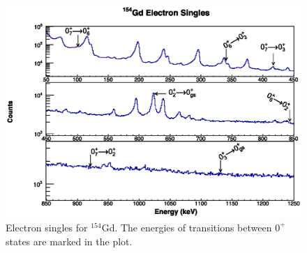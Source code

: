 \begin{figure}
    \centering
    \includegraphics[scale=0.8]{154GdTablesAndFigs/154Gd_Singles_Electron_Label.eps}
    \caption{Electron singles for $^{154}$Gd. The energies of transitions between $0^+$ states are marked in the plot.}
    \label{fig:154_e_singles}
\end{figure}